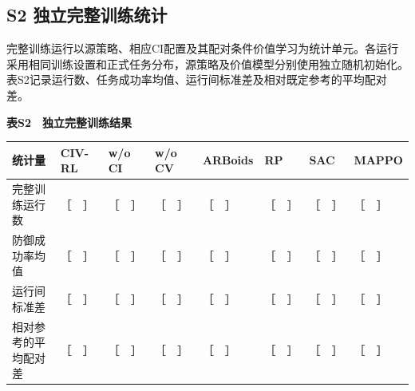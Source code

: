 \documentclass[UTF8,a4paper,zihao=5,fontset=none]{ctexart}
\begin{document}
\subsection*{S2
独立完整训练统计}

完整训练运行以源策略、相应CI配置及其配对条件价值学习为统计单元。各运行采用相同训练设置和正式任务分布，源策略及价值模型分别使用独立随机初始化。表S2记录运行数、任务成功率均值、运行间标准差及相对既定参考的平均配对差。

\begin{center}\small\bfseries 表S2　独立完整训练结果\end{center}

\begingroup
\small
\setlength{\tabcolsep}{3.2pt}
\begin{longtable}{@{}>{\raggedright\arraybackslash}p{}
>{\raggedright\arraybackslash}p{}
>{\raggedright\arraybackslash}p{}
>{\raggedright\arraybackslash}p{}
>{\raggedright\arraybackslash}p{}
>{\raggedright\arraybackslash}p{}
>{\raggedright\arraybackslash}p{}
>{\raggedright\arraybackslash}p{}@{}}
\toprule\noalign{}
\begin{minipage}[b]{\linewidth}\raggedright
统计量
\end{minipage} & \begin{minipage}[b]{\linewidth}\raggedright
CIV-RL
\end{minipage} & \begin{minipage}[b]{\linewidth}\raggedright
w/o CI
\end{minipage} & \begin{minipage}[b]{\linewidth}\raggedright
w/o CV
\end{minipage} & \begin{minipage}[b]{\linewidth}\raggedright
ARBoids
\end{minipage} & \begin{minipage}[b]{\linewidth}\raggedright
RP
\end{minipage} & \begin{minipage}[b]{\linewidth}\raggedright
SAC
\end{minipage} & \begin{minipage}[b]{\linewidth}\raggedright
MAPPO
\end{minipage} \\
\midrule\noalign{}
\endhead
\bottomrule\noalign{}
\endlastfoot
完整训练运行数 & ［　］ & ［　］ & ［　］ & ［　］ & ［　］ & ［　］ &
［　］ \\
防御成功率均值 & ［　］ & ［　］ & ［　］ & ［　］ & ［　］ & ［　］ &
［　］ \\
运行间标准差 & ［　］ & ［　］ & ［　］ & ［　］ & ［　］ & ［　］ &
［　］ \\
相对参考的平均配对差 & ［　］ & ［　］ & ［　］ & ［　］ & ［　］ &
［　］ & ［　］ \\
\end{longtable}
\endgroup
\end{document}
